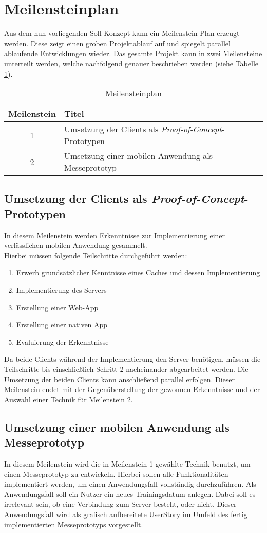 \section{Meilensteinplan}
\label{sec:meilenstein-plan}
Aus dem nun vorliegenden Soll-Konzept kann ein Meilenstein-Plan erzeugt werden. Diese zeigt einen groben Projektablauf auf und spiegelt parallel ablaufende Entwicklungen wieder. Das gesamte Projekt kann in zwei Meilensteine unterteilt werden, welche nachfolgend genauer beschrieben werden (siehe Tabelle \ref{tbl:meilensteinplan}).
\begin{table}[!h]
\centering
\caption{Meilensteinplan}
\label{tbl:meilensteinplan}
\begin{tabular}{|c|l|}
\hline
{\bf Meilenstein} & {\bf Titel}                                                      \\ \hline
1                 & Umsetzung der Clients als \textit{Proof-of-Concept}-Prototypen \\ \hline
2                 & Umsetzung einer mobilen Anwendung als Messeprototyp              \\ \hline
\end{tabular}
\end{table}

\subsection{Umsetzung der Clients als \textit{Proof-of-Concept}-Prototypen}
In diesem Meilenstein werden Erkenntnisse zur Implementierung einer verlässlichen mobilen Anwendung gesammelt. \\
Hierbei müssen folgende Teilschritte durchgeführt werden:
\begin{enumerate}
\item Erwerb grundsätzlicher Kenntnisse eines Caches und dessen Implementierung
\item Implementierung des Servers 
\item Erstellung einer \ac{Web-App}
\item Erstellung einer nativen \gls{App}
\item Evaluierung der Erkenntnisse
\end{enumerate}
Da beide Clients während der Implementierung den Server benötigen, müssen die Teilschritte bis einschließlich Schritt 2 nacheinander abgearbeitet werden. Die Umsetzung der beiden Clients kann anschließend parallel erfolgen. Dieser Meilenstein endet mit der Gegenüberstellung der gewonnen Erkenntnisse und der Auswahl einer Technik für Meilenstein 2.
\subsection{Umsetzung einer mobilen Anwendung als Messeprototyp}
In diesem Meilenstein wird die in Meilenstein 1 gewählte Technik benutzt, um einen Messeprototyp zu entwickeln. Hierbei sollen alle Funktionalitäten implementiert werden, um einen Anwendungsfall vollständig durchzuführen. Als Anwendungsfall soll ein Nutzer ein neues Trainingsdatum anlegen. Dabei soll es irrelevant sein, ob eine Verbindung zum Server besteht, oder nicht. Dieser Anwendungsfall wird als grafisch aufbereitete \gls{UserStory} im Umfeld des fertig implementierten Messeprototyps vorgestellt.